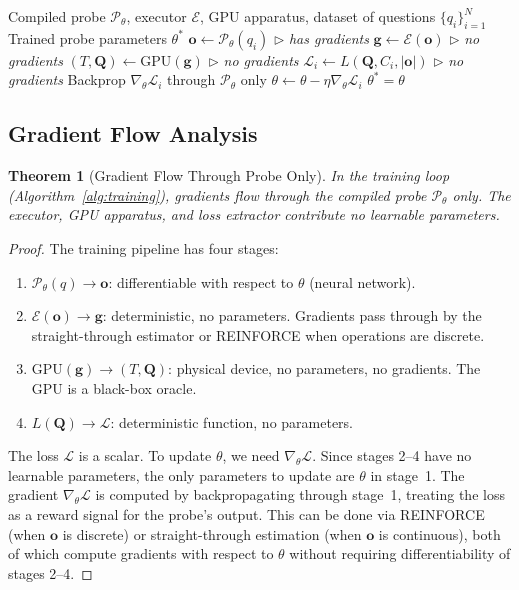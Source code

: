 \documentclass[11pt,twocolumn,a4paper]{article}
\newtheorem{theorem}{Theorem}[section]
\theoremstyle{definition}
\theoremstyle{remark}
\newcommand{\loss}{\mathcal{L}}
\newcommand{\params}{\theta}
\newcommand{\probe}{\mathcal{P}}
\newcommand{\engine}{\mathcal{E}}
\begin{document}
\begin{algorithm}[H]
\caption{Universal Training Loop}
\label{alg:training}
\begin{algorithmic}[1]
\REQUIRE Compiled probe $\probe_\params$, executor $\engine$, GPU apparatus, dataset of questions $\{q_i\}_{i=1}^N$
\ENSURE Trained probe parameters $\params^*$
        \STATE $\mathbf{o} \leftarrow \probe_\params(q_i)$ \hfill $\triangleright$ \textit{has gradients}
        \STATE $\mathbf{g} \leftarrow \engine(\mathbf{o})$ \hfill $\triangleright$ \textit{no gradients}
        \STATE $(T, \mathbf{Q}) \leftarrow \text{GPU}(\mathbf{g})$ \hfill $\triangleright$ \textit{no gradients}
        \STATE $\loss_i \leftarrow L(\mathbf{Q}, C_i, |\mathbf{o}|)$ \hfill $\triangleright$ \textit{no gradients}
        \STATE Backprop $\nabla_\params \loss_i$ through $\probe_\params$ only
        \STATE $\params \leftarrow \params - \eta \nabla_\params \loss_i$
    \ENDFOR
\ENDFOR
\RETURN $\params^* = \params$
\end{algorithmic}
\end{algorithm}

\subsection{Gradient Flow Analysis}

\begin{theorem}[Gradient Flow Through Probe Only]
\label{thm:gradient_flow}
In the training loop (Algorithm~\ref{alg:training}), gradients flow through the compiled probe $\probe_\params$ only. The executor, GPU apparatus, and loss extractor contribute no learnable parameters.
\end{theorem}

\begin{proof}
The training pipeline has four stages:
\begin{enumerate}[nosep]
\item $\probe_\params(q) \to \mathbf{o}$: differentiable with respect to $\params$ (neural network).
\item $\engine(\mathbf{o}) \to \mathbf{g}$: deterministic, no parameters. Gradients pass through by the straight-through estimator or REINFORCE \citep{sachikonye2025f} when operations are discrete.
\item $\text{GPU}(\mathbf{g}) \to (T, \mathbf{Q})$: physical device, no parameters, no gradients. The GPU is a black-box oracle.
\item $L(\mathbf{Q}) \to \loss$: deterministic function, no parameters.
\end{enumerate}
The loss $\loss$ is a scalar. To update $\params$, we need $\nabla_\params \loss$. Since stages 2--4 have no learnable parameters, the only parameters to update are $\params$ in stage~1. The gradient $\nabla_\params \loss$ is computed by backpropagating through stage~1, treating the loss as a reward signal for the probe's output. This can be done via REINFORCE (when $\mathbf{o}$ is discrete) or straight-through estimation (when $\mathbf{o}$ is continuous), both of which compute gradients with respect to $\params$ without requiring differentiability of stages 2--4.
\end{proof}
\end{document}
